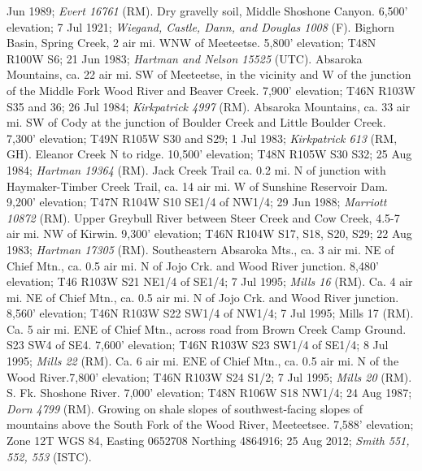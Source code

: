 Jun 1989; \textit{Evert 16761} (RM).  Dry gravelly soil, Middle Shoshone Canyon.  6,500’ elevation; 7 Jul 1921; \textit{Wiegand, Castle, Dann, and Douglas 1008} (F).  Bighorn Basin, Spring Creek, 2 air mi. WNW of Meeteetse.  5,800’ elevation; T48N R100W S6; 21 Jun 1983; \textit{Hartman and Nelson 15525} (UTC).  Absaroka Mountains, ca. 22 air mi. SW of Meeteetse, in the vicinity and W of the junction of the Middle Fork Wood River and Beaver Creek.  7,900’ elevation; T46N R103W S35 and 36; 26 Jul 1984; \textit{Kirkpatrick 4997} (RM).  Absaroka Mountains, ca. 33 air mi. SW of Cody at the junction of Boulder Creek and Little Boulder Creek. 7,300’ elevation; T49N R105W S30 and S29; 1 Jul 1983; \textit{Kirkpatrick 613} (RM, GH).  Eleanor Creek N to ridge. 10,500’ elevation; T48N R105W S30 S32; 25 Aug 1984; \textit{Hartman 19364} (RM).  Jack Creek Trail ca. 0.2 mi. N of junction with Haymaker-Timber Creek Trail, ca. 14 air mi. W of Sunshine Reservoir Dam.  9,200’ elevation; T47N R104W S10 SE1/4 of NW1/4; 29 Jun 1988; \textit{Marriott 10872} (RM).  Upper Greybull River between Steer Creek and Cow Creek, 4.5-7 air mi. NW of Kirwin. 9,300’ elevation; T46N R104W S17, S18, S20, S29; 22 Aug 1983; \textit{Hartman 17305} (RM).  Southeastern Absaroka Mts., ca. 3 air mi. NE of Chief Mtn., ca. 0.5 air mi. N of Jojo Crk. and Wood River junction.  8,480’ elevation; T46 R103W S21 NE1/4 of SE1/4; 7 Jul 1995; \textit{Mills 16} (RM).  Ca. 4 air mi. NE of Chief Mtn., ca. 0.5 air mi. N of Jojo Crk. and Wood River junction.  8,560’ elevation; T46N R103W S22 SW1/4 of NW1/4; 7 Jul 1995; Mills 17 (RM).  Ca. 5 air mi. ENE of Chief Mtn., across road from Brown Creek Camp Ground. S23 SW4 of SE4. 7,600’ elevation; T46N R103W S23 SW1/4 of SE1/4; 8 Jul 1995; \textit{Mills 22} (RM).  Ca. 6 air mi. ENE of Chief Mtn., ca. 0.5 air mi. N of the Wood River.7,800’ elevation; T46N R103W S24 S1/2; 7 Jul 1995; \textit{Mills 20} (RM).  S. Fk. Shoshone River.  7,000’ elevation; T48N R106W S18 NW1/4; 24 Aug 1987; \textit{Dorn 4799} (RM).  Growing on shale slopes of southwest-facing slopes of mountains above the South Fork of the Wood River, Meeteetsee.  7,588’ elevation; Zone 12T WGS 84, Easting 0652708 Northing 4864916; 25 Aug 2012; \textit{Smith 551, 552, 553} (ISTC).  

